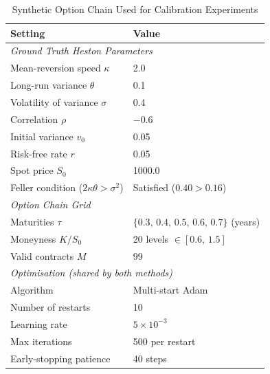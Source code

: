 \begin{table}[htbp]
  \centering
  \caption{Synthetic Option Chain Used for Calibration Experiments}
  \label{tab:synthetic_setup}
  \begin{tabular}{ll}
    \toprule
    \textbf{Setting} & \textbf{Value} \\
    \midrule
    \multicolumn{2}{l}{\textit{Ground Truth Heston Parameters}} \\
    \quad Mean-reversion speed $\kappa$       & 2.0 \\
    \quad Long-run variance $\theta$          & 0.1 \\
    \quad Volatility of variance $\sigma$     & 0.4 \\
    \quad Correlation $\rho$                  & $-0.6$ \\
    \quad Initial variance $v_0$              & 0.05 \\
    \quad Risk-free rate $r$                  & 0.05 \\
    \quad Spot price $S_0$                    & 1000.0 \\
    \quad Feller condition ($2\kappa\theta > \sigma^2$) & Satisfied ($0.40 > 0.16$) \\
    \midrule
    \multicolumn{2}{l}{\textit{Option Chain Grid}} \\
    \quad Maturities $\tau$   & $\{0.3,\, 0.4,\, 0.5,\, 0.6,\, 0.7\}$ (years) \\
    \quad Moneyness $K/S_0$   & 20 levels $\in [0.6,\, 1.5]$ \\
    \quad Valid contracts $M$ & 99 \\
    \midrule
    \multicolumn{2}{l}{\textit{Optimisation (shared by both methods)}} \\
    \quad Algorithm          & Multi-start Adam \\
    \quad Number of restarts & 10 \\
    \quad Learning rate      & $5\times10^{-3}$ \\
    \quad Max iterations     & 500 per restart \\
    \quad Early-stopping patience & 40 steps \\
    \bottomrule
  \end{tabular}
\end{table}


